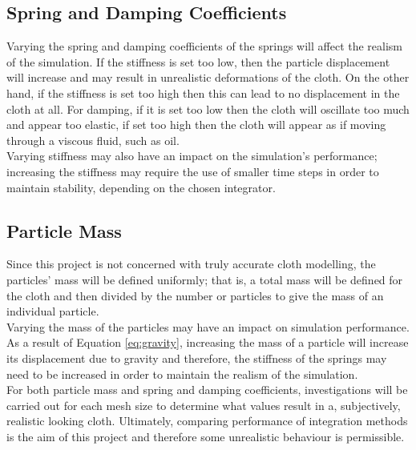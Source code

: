 \subsection{Spring and Damping Coefficients}
Varying the spring and damping coefficients of the springs will affect the realism of the simulation. If the stiffness is set too low, then the particle displacement will increase and may result in unrealistic deformations of the cloth. On the other hand, if the stiffness is set too high then this can lead to no displacement in the cloth at all. For damping, if it is set too low then the cloth will oscillate too much and appear too elastic, if set too high then the cloth will appear as if moving through a viscous fluid, such as oil.
\\Varying stiffness may also have an impact on the simulation's performance; increasing the stiffness may require the use of smaller time steps in order to maintain stability, depending on the chosen integrator.

\subsection{Particle Mass}
Since this project is not concerned with truly accurate cloth modelling, the particles' mass will be defined uniformly; that is, a total mass will be defined for the cloth and then divided by the number or particles to give the mass of an individual particle.
\\Varying the mass of the particles may have an impact on simulation performance. As a result of Equation \ref{eq:gravity}, increasing the mass of a particle will increase its displacement due to gravity and therefore, the stiffness of the springs may need to be increased in order to maintain the realism of the simulation. 
\\For both particle mass and spring and damping coefficients, investigations will be carried out for each mesh size to determine what values result in a, subjectively, realistic looking cloth. Ultimately, comparing performance of integration methods is the aim of this project and therefore some unrealistic behaviour is permissible.

